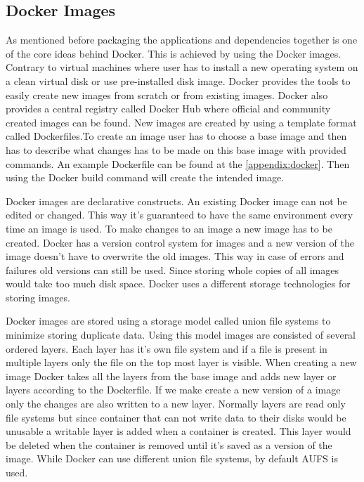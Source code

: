 \documentclass[12pt,oneandhalf,chaparabic,ceng,ms,eng,oneside,pntc]{gsufbe}
\begin{document}
\subsection{Docker Images}
As mentioned before packaging the applications and dependencies together is one of the core ideas
behind Docker. This is achieved by using the Docker images. Contrary to virtual machines where user
has to install a new operating system on a clean virtual disk or use pre-installed disk image. Docker 
provides the tools to easily create new images from scratch or from existing images. Docker also
provides a central registry called Docker Hub where official and community created images can be found.
New images are created by using a template format called Dockerfiles.To create an image user has to
choose a base image and then has to describe what changes has to be made on this base image with
provided commands. An example Dockerfile can be found at the \ref{appendix:docker}. Then using the
Docker build command will create the intended image.

Docker images are declarative constructs. An existing Docker image can not be edited or changed. This
way it's guaranteed to have the same environment every time an image is used. To make changes to an
image a new image has to be created. Docker has a version control system for images and a new version
of the image doesn't have to overwrite the old images. This way in case of errors and failures old
versions can still be used. Since storing whole copies of all images would take too much disk space.
Docker uses a different storage technologies for storing images.

Docker images are stored using a storage model called union file systems to minimize storing duplicate
data. Using this model images are consisted of several ordered layers. Each layer has it's own file
system and if a file is present in multiple layers only the file on the top most layer is visible. When
creating a new image Docker takes all the layers from the base image and adds new layer or layers
according to the Dockerfile. If we make create a new version of a image only the changes are also 
written to a new layer. Normally layers are read only file systems but since container that can not
write data to their disks would be unusable a writable layer is added when a container is created. This
layer would be deleted when the container is removed until it's saved as a version of the image.
While Docker can use different union file systems, by default AUFS is used.
\end{document}
